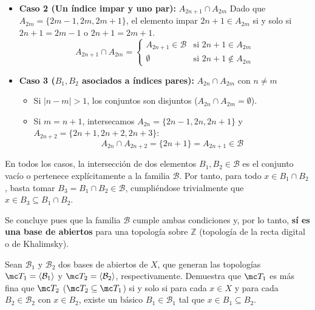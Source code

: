 \begin{sol}
\begin{itemize}
        \item \textbf{Caso 2 (Un índice impar y uno par):} $A_{2n+1} \cap A_{2m}$
        Dado que $A_{2m} = \{2m-1, 2m, 2m+1\}$, el elemento impar $2n+1 \in A_{2m}$ si y solo si $2n+1 = 2m-1$ o $2n+1 = 2m+1$.
        \[
            A_{2n+1} \cap A_{2m} = \begin{cases}
                A_{2n+1} \in \mathcal{B} & \text{si } 2n+1 \in A_{2m} \\
                \emptyset & \text{si } 2n+1 \notin A_{2m}
            \end{cases}
        \]

        \item \textbf{Caso 3 ($B_1, B_2$ asociados a índices pares):} $A_{2n} \cap A_{2m}$ con $n \neq m$
        \begin{itemize}
            \item Si $|n - m| > 1$, los conjuntos son disjuntos ($A_{2n} \cap A_{2m} = \emptyset$).
            \item Si $m = n+1$, intersecamos $A_{2n} = \{2n-1, 2n, 2n+1\}$ y $A_{2n+2} = \{2n+1, 2n+2, 2n+3\}$:
            \[
                A_{2n} \cap A_{2n+2} = \{2n+1\} = A_{2n+1} \in \mathcal{B}
            \]
        \end{itemize}
    \end{itemize}

    En todos los casos, la intersección de dos elementos $B_1, B_2 \in \mathcal{B}$ es el conjunto vacío o pertenece explícitamente a la familia $\mathcal{B}$. Por tanto, para todo $x \in B_1 \cap B_2$, basta tomar $B_3 = B_1 \cap B_2 \in \mathcal{B}$, cumpliéndose trivialmente que $x \in B_3 \subseteq B_1 \cap B_2$.

    \medskip

    Se concluye pues que la familia $\mathcal{B}$ cumple ambas condiciones y, por lo tanto, \textbf{sí es una base de abiertos} para una topología sobre $\mathbb{Z}$ (topología de la recta digital o de Khalimsky).
\end{sol}\begin{ejer}
    [28] Sean $\mathcal{B}_1$ y $\mathcal{B}_2$ dos bases de abiertos de $X$, que generan las topologías $\mc T_1 = \langle \mathcal{B}_1 \rangle$ y $\mc T_2 = \langle \mathcal{B}_2 \rangle$, respectivamente. Demuestra que $\mc T_1$ es más fina que $\mc T_2$ ($\mc T_2 \subseteq \mc T_1$) si y solo si para cada $x \in X$ y para cada $B_2 \in \mathcal{B}_2$ con $x \in B_2$, existe un básico $B_1 \in \mathcal{B}_1$ tal que $x \in B_1 \subseteq B_2$.
\end{ejer}

